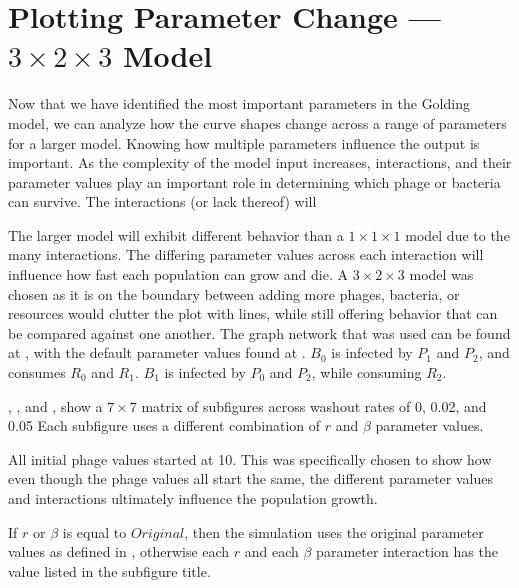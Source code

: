 \section{Plotting Parameter Change — $3\times 2\times 3$ Model}
Now that we have identified the most important parameters in the Golding model, we can analyze how the curve shapes change across a range of parameters for a larger model. 
Knowing how multiple parameters influence the output is important. 
As the complexity of the model input increases, interactions, and their parameter values play an important role in determining which phage or bacteria can survive. 
The interactions (or lack thereof) will 

The larger model will exhibit different behavior than a $1\times 1\times 1$ model due to the many interactions. 
The differing parameter values across each interaction will influence how fast each population can grow and die. 
A $3\times 2\times 3$ model was chosen as it is on the boundary between adding more phages, bacteria, or resources would clutter the plot with lines, while still offering behavior that can be compared against one another. 
The graph network that was used can be found at , with the default parameter values found at . 
$B_0$ is infected by $P_1$ and $P_2$, and consumes $R_0$ and $R_1$. 
$B_1$ is infected by $P_0$ and $P_2$, while consuming $R_2$. 


, , and , show a $7\times7$ matrix of subfigures across washout rates of 0, 0.02, and 0.05
Each subfigure uses a different combination of $r$ and $\beta$ parameter values. 

All initial phage values started at 10. 
This was specifically chosen to show how even though the phage values all start the same, the different parameter values and interactions ultimately influence the population growth. 

If $r$ or $\beta$ is equal to $Original$, then the simulation uses the original parameter values as defined in , otherwise each $r$ and each $\beta$ parameter interaction has the value listed in the subfigure title. 

